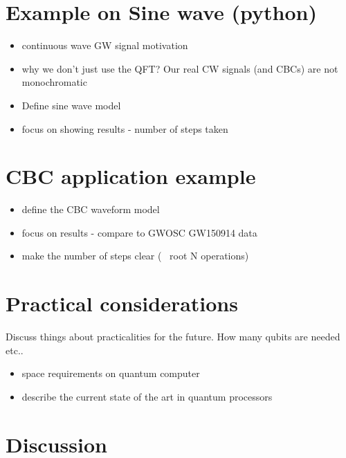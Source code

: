 \documentclass[aps,prd,nofootinbib,twocolumn,reprint,superscriptaddress,showpacs,showkeys,longbibliography]{revtex4-1}
\begin{document}
\section{Example on Sine wave (python)}\label{sec:sineexample}

\begin{itemize}
\item continuous wave GW signal motivation
\item why we don't just use the QFT? Our real CW signals (and CBCs) are not monochromatic
\item Define sine wave model
\item focus on showing results - number of steps taken
\end{itemize}

\section{CBC application example}\label{sec:cbcexample}

\begin{itemize}
\item define the CBC waveform model
\item focus on results - compare to GWOSC GW150914 data
\item make the number of steps clear (~ root N operations)
\end{itemize}

\section{Practical considerations}\label{sec:praccon}

Discuss things about practicalities for the future. How many qubits are needed
etc.. 

\begin{itemize}
\item space requirements on quantum computer
\item describe the current state of the art in quantum processors
\end{itemize}

\section{Discussion}\label{sec:discussion}
\end{document}
